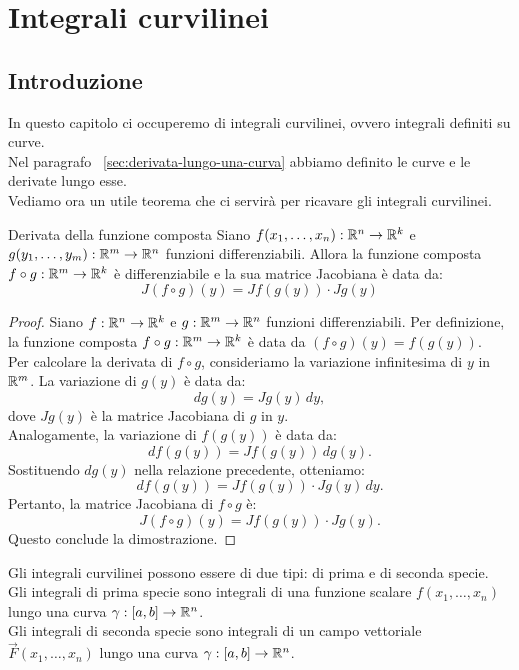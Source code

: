 \chapter{Integrali curvilinei}

\section{Introduzione}
In questo capitolo ci occuperemo di integrali curvilinei, ovvero integrali definiti su curve.\\
Nel paragrafo ~\ref{sec:derivata-lungo-una-curva} abbiamo definito le curve e le derivate lungo esse.\\
Vediamo ora un utile teorema che ci servirà per ricavare gli integrali curvilinei.

\begin{teorema}{Derivata della funzione composta}
  Siano $f(x_1, \dots, x_n): \mathbb{R}^n \rightarrow \mathbb{R}^k$ e $g(y_1, \dots, y_m): \mathbb{R}^m \rightarrow \mathbb{R}^n$ funzioni differenziabili. Allora la funzione composta $f \circ g: \mathbb{R}^m \rightarrow \mathbb{R}^k$ è differenziabile e la sua matrice Jacobiana è data da:
  $$J(f \circ g)(y) = Jf(g(y)) \cdot Jg(y)$$
\end{teorema}

\begin{proof}
Siano $f: \mathbb{R}^n \rightarrow \mathbb{R}^k$ e $g: \mathbb{R}^m \rightarrow \mathbb{R}^n$ funzioni differenziabili. Per definizione, la funzione composta $f \circ g: \mathbb{R}^m \rightarrow \mathbb{R}^k$ è data da $(f \circ g)(y) = f(g(y))$.\\
Per calcolare la derivata di $f \circ g$, consideriamo la variazione infinitesima di $y$ in $\mathbb{R}^m$. La variazione di $g(y)$ è data da:
$$dg(y) = Jg(y) \, dy,$$
dove $Jg(y)$ è la matrice Jacobiana di $g$ in $y$.\\
Analogamente, la variazione di $f(g(y))$ è data da:
$$df(g(y)) = Jf(g(y)) \, dg(y).$$
Sostituendo $dg(y)$ nella relazione precedente, otteniamo:
$$df(g(y)) = Jf(g(y)) \cdot Jg(y) \, dy.$$
Pertanto, la matrice Jacobiana di $f \circ g$ è:
$$J(f \circ g)(y) = Jf(g(y)) \cdot Jg(y).$$
Questo conclude la dimostrazione.
\end{proof}

Gli integrali curvilinei possono essere di due tipi: di prima e di seconda specie.\\
Gli integrali di prima specie sono integrali di una funzione scalare $f(x_1, \dots, x_n)$ lungo una curva $\gamma: [a, b] \rightarrow \mathbb{R}^n$.\\
Gli integrali di seconda specie sono integrali di un campo vettoriale $\vec F(x_1, \dots, x_n)$ lungo una curva $\gamma: [a, b] \rightarrow \mathbb{R}^n$.\\

